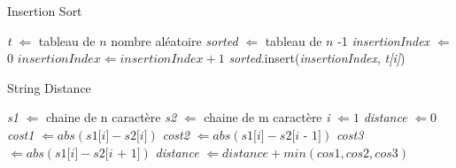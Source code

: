 \documentclass[11pt]{extarticle}
\begin{document}
\begin{center}
\begin{algorithm}
\caption{Insertion Sort}\label{insertion_sort}
\begin{algorithmic} %
    \State \textit{t} $\Leftarrow $ tableau de $n$ nombre aléatoire
    \State \textit{sorted} $\Leftarrow $ tableau de $n$ -1
    	\State \textit{insertionIndex} $\Leftarrow$ 0
			\State $\textit{insertionIndex} \Leftarrow \textit{insertionIndex} + 1$
		\EndWhile
		\State \textit{sorted}.insert(\textit{insertionIndex}, \textit{t[i]})
	\EndFor
\end{algorithmic}
\end{algorithm}

\begin{algorithm}
\caption{String Distance}\label{string_distance}
\begin{algorithmic} %
    \State \textit{s1} $\Leftarrow $ chaine de n caractère
    \State \textit{s2} $\Leftarrow $ chaine de m caractère
    \State \textit{i} $\Leftarrow 1$
    \State \textit{distance} $\Leftarrow 0$
		\State \textit{cost1} $\Leftarrow abs(\textit{s1[i]} - \textit{s2[i]})$
		\State \textit{cost2} $\Leftarrow abs(\textit{s1[i]} - \textit{s2[i - 1]})$
		\State \textit{cost3} $\Leftarrow abs(\textit{s1[i]} - \textit{s2[i + 1]})$
		\State \textit{distance} $\Leftarrow \textit{distance} + min(\textit{cos1}, \textit{cos2}, \textit{cos3})$
	\EndWhile
\end{algorithmic}
\end{algorithm}
\end{center}
\newpage
\end{document}
